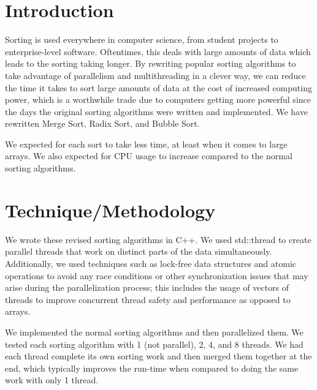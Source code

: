 \documentclass[conference]{IEEEtran}
\begin{document}
\section{Introduction}
Sorting is used everywhere in computer science, from student projects to enterprise-level software. Oftentimes, this deals with large amounts of data which leads to the sorting taking longer. By rewriting popular sorting algorithms to take advantage of parallelism and multithreading in a clever way, we can reduce the time it takes to sort large amounts of data at the cost of increased computing power, which is a worthwhile trade due to computers getting more powerful since the days the original sorting algorithms were written and implemented. We have rewritten Merge Sort, Radix Sort, and Bubble Sort. 

We expected for each sort to take less time, at least when it comes to large arrays. We also expected for CPU usage to increase compared to the normal sorting algorithms.



\section{Technique/Methodology}
We wrote these revised sorting algorithms in C++. We used std::thread to create parallel threads that work on distinct parts of the data simultaneously. Additionally, we used techniques such as lock-free data structures and atomic operations to avoid any race conditions or other synchronization issues that may arise during the parallelization process; this includes the usage of vectors of threads to improve concurrent thread safety and performance as opposed to arrays.

We implemented the normal sorting algorithms and then parallelized them. We tested each sorting algorithm with 1 (not parallel), 2, 4, and 8 threads. We had each thread complete its own sorting work and then merged them together at the end, which typically improves the run-time when compared to doing the same work with only 1 thread.
\end{document}
